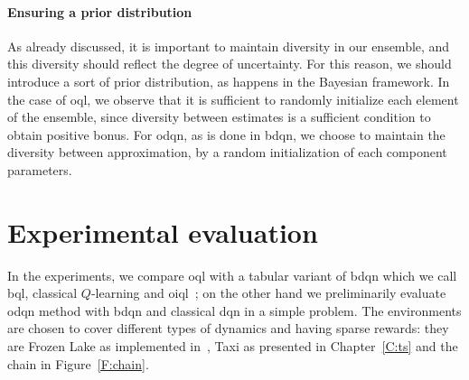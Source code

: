 \paragraph{Ensuring a prior distribution} As already discussed, it is important to maintain diversity in our ensemble, and this diversity should reflect the degree of uncertainty. For this reason, we should introduce a sort of prior distribution, as happens in the Bayesian framework. In the case of \gls{oql}, we observe that it is sufficient to randomly initialize each element of the ensemble, since diversity between estimates is a sufficient condition to obtain positive bonus.
For \gls{odqn}, as is done in \gls{bdqn}, we choose to maintain the diversity between approximation, by a random initialization of each component parameters.

\section{Experimental evaluation}
\label{S:odqn_experiments}
In the experiments, we compare \gls{oql} with a tabular variant of \gls{bdqn} which we call \gls{bql}, classical $Q$-learning and \gls{oiql}~\cite{sutton1998reinforcement}; on the other hand we preliminarily evaluate \gls{odqn} method with \gls{bdqn} and classical \gls{dqn} in a simple problem.
The environments are chosen to cover different types of dynamics and having sparse rewards: they are Frozen Lake as implemented in~\cite{gym}, Taxi as presented in Chapter~\ref{C:ts} and the chain in Figure~\ref{F:chain}.

\begin{figure*}[t]
  \centering
  \caption{Structure of the Chain.}\label{F:chain}
\end{figure*}


